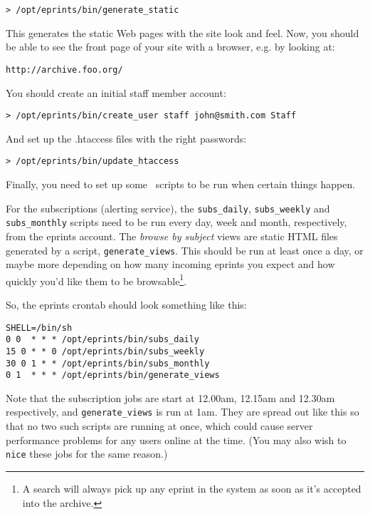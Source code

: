 \begin{verbatim}
> /opt/eprints/bin/generate_static
\end{verbatim}

This generates the static Web pages with the site look and feel. Now, you should be able to see the front page of your site with a browser, e.g. by looking at:

\begin{verbatim}
http://archive.foo.org/
\end{verbatim}

You should create an initial staff member account:

\begin{verbatim}
> /opt/eprints/bin/create_user staff john@smith.com Staff
\end{verbatim}

And set up the .htaccess files with the right passwords:

\begin{verbatim}
> /opt/eprints/bin/update_htaccess
\end{verbatim}

Finally, you need to set up some \eprints\ scripts to be run when certain things happen.

For the subscriptions (alerting service), the {\tt subs\_daily}, {\tt subs\_weekly} and {\tt subs\_monthly} scripts need to be run every day, week and month, respectively, from the eprints account. The \emph{browse by subject} views are static HTML files generated by a script, {\tt generate\_views}. This should be run at least once a day, or maybe more depending on how many incoming eprints you expect and how quickly you'd like them to be browsable\footnote{A search will always pick up any eprint in the system as soon as it's accepted into the archive.}.

So, the eprints crontab should look something like this:

\begin{verbatim}
SHELL=/bin/sh
0 0  * * * /opt/eprints/bin/subs_daily
15 0 * * 0 /opt/eprints/bin/subs_weekly
30 0 1 * * /opt/eprints/bin/subs_monthly
0 1  * * * /opt/eprints/bin/generate_views
\end{verbatim}

Note that the subscription jobs are start at 12.00am, 12.15am and 12.30am respectively, and {\tt generate\_views} is run at 1am. They are spread out like this so that no two such scripts are running at once, which could cause server performance problems for any users online at the time. (You may also wish to {\tt nice} these jobs for the same reason.)

